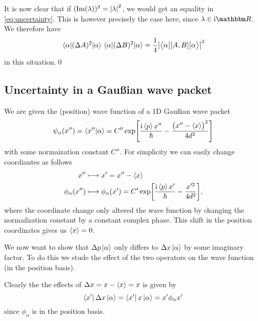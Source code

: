 \documentclass[11pt,letter, swedish, english
]{article}
\begin{document}
It is now clear that if $(\Im(\lambda))^2=\abs{\lambda}^2$, we would
get an equality in \eqref{eq:uncertainty}. This is however precisely
the case here, since $\lambda\in\ii\R$. We therefore have
\begin{equation} 
\ev{(\Delta{A})^2}{\alpha}\ev{(\Delta{B})^2}{\alpha} 
= \frac{1}{4} \abs{\ev**{\comm{A}{B}}{\big.\alpha}}^2
\end{equation}
in this situation.\qed

\subsection{Uncertainty in a Gaußian wave packet}
We are given the (position) wave function of a 1D Gaußian wave packet
\begin{equation}
\psi_\alpha(x'') = \braket{x''}{\alpha} 
= C'' \exp[\frac{\ii\ev{p}x''}{\hbar}-\frac{\big(x''-\ev{x}\!\big)^2}{4d^2}]
\end{equation}
with some normaization constant $C''$. For simplicity we can easily
change coordiantes as follows
\begin{equation}
\begin{aligned}
x'' \longmapsto&\; x'=x''-\ev{x}\\
\phi_\alpha(x'') \longmapsto&\; \phi_\alpha(x') 
= C' \exp[\frac{\ii\ev{p}x'}{\hbar}-\frac{x'^2}{4d^2}],
\end{aligned}
\end{equation}
where the coordinate change only altered the wave function by
changing the normailzation constant by a constant complex phase. This
shift in the position coordinates gives us $\ev{x}=0$.

We now want to show that $\Delta{p}\ket{\alpha}$ only differs to
$\Delta{x}\ket{\alpha}$ by some imaginary factor. To do this we stude
the effect of the two operators on the wave function (in the position
basis). 

Clearly the the effects of $\Delta{x}=x-\ev{x}=x$ is given by
\begin{equation}
\bra{x'}\Delta{x}\ket{\alpha} = \bra{x'}x\ket{\alpha} = x'\phi_\alpha{x'}
\end{equation}
since $\phi_\alpha$ is in the position basis. 
\end{document}
